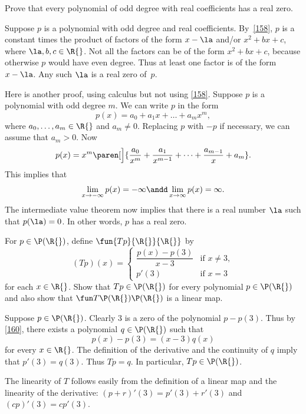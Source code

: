 \exercise
Prove that every polynomial of odd degree with real coefficients has a real zero.\label{4oddzero}

\begin{Solution}
Suppose $p$ is a polynomial with odd degree and real coefficients.
By~\ref{158}, $p$ is a constant times the product of factors of the form $x - \la$
and/or $x^2 + b x + c$, where $\la, b, c \in \R{}$.  Not all the
factors can be of the form $x^2 + b x + c$, because otherwise $p$ would
have even degree.  Thus at least one factor is of the form $x - \la$.  Any
such $\la$ is a real zero of~$p$.

\Comment
Here is another proof, using calculus but not using \ref{158}.  Suppose $p$ is a
polynomial with odd degree $m$.  We can write $p$ in the form
\[
p(x) = a_0 + a_1 x + \dots + a_m x^m,
\]
where $a_0, \dots, a_m \in \R{}$ and $a_m \ne 0$.  Replacing $p$ with $-p$ if
necessary, we can assume that $a_m > 0$.  Now
\[
p(x) = x^m \paren[\Big]{\frac{a_0}{x^m} + \frac{a_1}{x^{m-1}} + \dots
+ \frac{a_{m-1}}{x} + a_m}.
\]
This implies that
\[
\lim_{x \to -\infty} p(x) = -\infty \andd \lim_{x \to \infty} p(x) = \infty.
\]
The intermediate value theorem now implies that there is a real number $\la$ such
that $p(\la) = 0$.  In other words, $p$ has a real zero.
\end{Solution}

\exercise
For $p \in \P(\R{})$, define $\fun {Tp} {\R{}} {\R{}}$ by
\[
(Tp)(x) =
\begin{cases}
\dfrac{p(x) - p(3)}{x-3} & \text{if \ } x \ne 3,\\[9bp]
p' \! (3) & \text{if \ } x = 3
\end{cases}
\]
for each $x \in \R{}$. Show that $Tp \in \P(\R{})$ for every polynomial $p \in \P(\R{})$ and also show that $\fun T {\P(\R{})} {\P(\R{})}$ is a linear map.

\begin{Solution}
Suppose $p \in \P(\R{})$. Clearly $3$ is a zero of the polynomial $p - p(3)$. Thus by \ref{160}, there exists a polynomial $q \in \P(\R{})$ such that
\[
p(x) - p(3) = (x - 3) q(x)
\]
for every $x \in \R{}$. The definition of the derivative and the continuity of $q$ imply that $p' \! (3) = q(3)$. Thus $Tp = q$. In particular, $Tp \in \P(\R{})$.

The linearity of $T$ follows easily from the definition of a linear map and the linearity of the derivative: $(p + r)' \! (3) = p' \! (3) + r' \! (3)$ and $(cp)' \! (3) = c p' \! (3)$.
\end{Solution}

